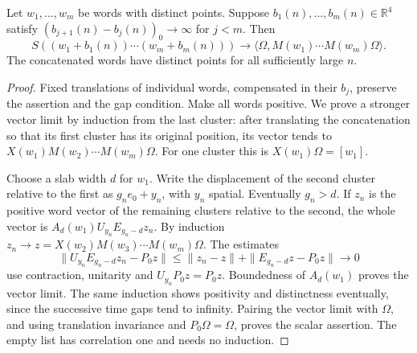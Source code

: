\begin{lemma}\label{ex-cluster-train}
Let \(w_1,\ldots,w_m\) be words with distinct points. Suppose
\(b_1(n),\ldots,b_m(n)\in\mathbb R^4\) satisfy
\((b_{j+1}(n)-b_j(n))_0\to\infty\) for \(j<m\). Then
\[
 S((w_1+b_1(n))\cdots(w_m+b_m(n)))
 \longrightarrow\langle\Omega,M(w_1)\cdots M(w_m)\Omega\rangle.
\]
The concatenated words have distinct points for all sufficiently large \(n\).
\end{lemma}
\begin{proof}
Fixed translations of individual words, compensated in their \(b_j\),
preserve the assertion and the gap condition. Make all words positive.
We prove a stronger vector limit by induction from the last cluster:
after translating the concatenation so that its first cluster has its
original position, its vector tends to
\(X(w_1)M(w_2)\cdots M(w_m)\Omega\).
For one cluster this is \(X(w_1)\Omega=[w_1]\).

Choose a slab width \(d\) for \(w_1\). Write the displacement of the
second cluster relative to the first as \(g_ne_0+y_n\), with \(y_n\)
spatial. Eventually \(g_n>d\). If \(z_n\) is the positive word vector
of the remaining clusters relative to the second, the whole vector is
\(A_d(w_1)U_{y_n}E_{g_n-d}z_n\).
By induction \(z_n\to z=X(w_2)M(w_3)\cdots M(w_m)\Omega\).
The estimates
\[
 \|U_{y_n}E_{g_n-d}z_n-P_0z\|
 \le\|z_n-z\|+\|E_{g_n-d}z-P_0z\|\longrightarrow0
\]
use contraction, unitarity and \(U_{y_n}P_0z=P_0z\). Boundedness of
\(A_d(w_1)\) proves the vector limit. The same induction shows positivity
and distinctness eventually, since the successive time gaps tend to
infinity. Pairing the vector limit with \(\Omega\), and using translation
invariance and \(P_0\Omega=\Omega\), proves the scalar assertion.
The empty list has correlation one and needs no induction.
\end{proof}

